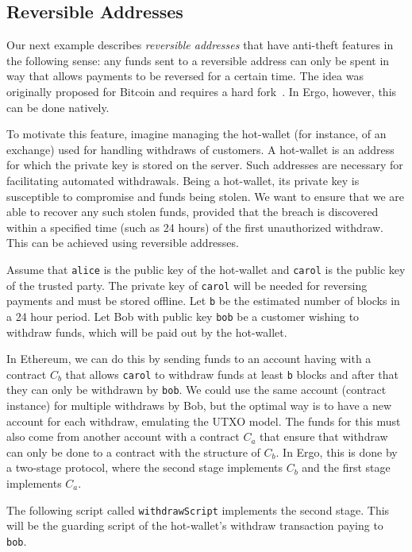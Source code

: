 \documentclass[runningheads]{llncs}
\begin{document}
\subsection{Reversible Addresses}
\label{reversible}

Our next example describes {\em reversible addresses} that have anti-theft features in the following sense: any funds sent to a reversible address can only be spent in way that allows payments to be reversed for a certain time. The idea was originally proposed for Bitcoin and requires a hard fork~\cite{raddress}. In Ergo, however, this can be done natively.

To motivate this feature, imagine managing the hot-wallet (for instance, of an exchange) used for handling withdraws of customers. A hot-wallet is an address for which the private key is stored on the server. Such addresses are necessary for facilitating automated withdrawals. Being a hot-wallet, its private key is susceptible to compromise and funds being stolen. 
We want to ensure that we are able to recover any such stolen funds, provided that the breach is discovered within a specified time (such as 24 hours) of the first unauthorized withdraw. This can be achieved using reversible addresses.

Assume that \texttt{alice} is the public key of the hot-wallet and \texttt{carol} is the public key of the trusted party. The private key of \texttt{carol} will be needed for reversing payments and must be stored offline. Let \texttt{b} be the estimated number of blocks in a 24 hour period. 
Let Bob with public key \texttt{bob} be a customer wishing to withdraw funds, which will be paid out by the hot-wallet. 

In Ethereum, we can do this by sending funds to an account having with a contract $C_{b}$ that allows \texttt{carol} to withdraw funds at least \texttt{b} blocks and after that they can only be withdrawn by \texttt{bob}. We could use the same account (contract instance) for multiple withdraws by Bob, but the optimal way is to have a new account for each withdraw, emulating the UTXO model. The funds for this must also come from another account with a contract $C_{a}$ that ensure that withdraw can only be done to a contract with the structure of $C_{b}$. 
In Ergo, this is done by a two-stage protocol, where the second stage implements $C_{b}$ and the first stage implements $C_{a}$. 

The following script called \texttt{withdrawScript} implements the second stage. This will be the guarding script of the hot-wallet's withdraw transaction paying to \texttt{bob}.
\end{document}
